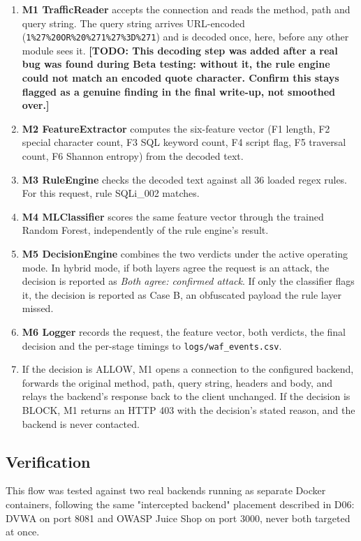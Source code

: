 \documentclass{llncs}
\newcommand{\TODO}[1]{\textbf{[TODO: #1]}}
\begin{document}
\begin{enumerate}
  \item \textbf{M1 TrafficReader} accepts the connection and reads the
        method, path and query string. The query string arrives
        URL-encoded (\texttt{1\%27\%20OR\%20\%271\%27\%3D\%271}) and is
        decoded once, here, before any other module sees it.
        \TODO{This decoding step was added after a real bug was found
        during Beta testing: without it, the rule engine could not match
        an encoded quote character. Confirm this stays flagged as a
        genuine finding in the final write-up, not smoothed over.}
  \item \textbf{M2 FeatureExtractor} computes the six-feature vector
        (F1 length, F2 special character count, F3 SQL keyword count,
        F4 script flag, F5 traversal count, F6 Shannon entropy) from the
        decoded text.
  \item \textbf{M3 RuleEngine} checks the decoded text against all 36
        loaded regex rules. For this request, rule SQLi\_002 matches.
  \item \textbf{M4 MLClassifier} scores the same feature vector through
        the trained Random Forest, independently of the rule engine's
        result.
  \item \textbf{M5 DecisionEngine} combines the two verdicts under the
        active operating mode. In hybrid mode, if both layers agree the
        request is an attack, the decision is reported as \emph{Both
        agree: confirmed attack}. If only the classifier flags it, the
        decision is reported as Case B, an obfuscated payload the rule
        layer missed.
  \item \textbf{M6 Logger} records the request, the feature vector, both
        verdicts, the final decision and the per-stage timings to
        \texttt{logs/waf\_events.csv}.
  \item If the decision is ALLOW, M1 opens a connection to the
        configured backend, forwards the original method, path, query
        string, headers and body, and relays the backend's response back
        to the client unchanged. If the decision is BLOCK, M1 returns an
        HTTP 403 with the decision's stated reason, and the backend is
        never contacted.
\end{enumerate}

\subsection{Verification}
This flow was tested against two real backends running as separate
Docker containers, following the same "intercepted backend" placement
described in D06: DVWA on port 8081 and OWASP Juice Shop on port 3000,
never both targeted at once.
\end{document}
